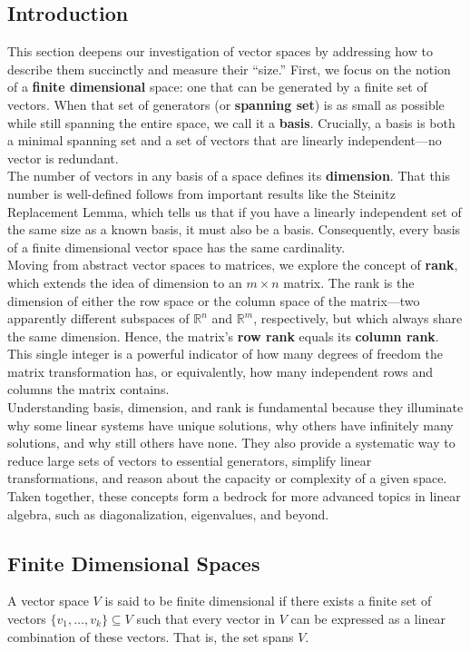 \documentclass[a4paper, 9pt]{extarticle}
\begin{document}
\subsection*{Introduction}
This section deepens our investigation of vector spaces by addressing how to describe them succinctly and measure their “size.” First, we focus on the notion of a \textbf{finite dimensional} space: one that can be generated by a finite set of vectors. When that set of generators (or \textbf{spanning set}) is as small as possible while still spanning the entire space, we call it a \textbf{basis}. Crucially, a basis is both a minimal spanning set and a set of vectors that are linearly independent—no vector is redundant. \\[2ex]
\noindent The number of vectors in any basis of a space defines its \textbf{dimension}. That this number is well-defined follows from important results like the Steinitz Replacement Lemma, which tells us that if you have a linearly independent set of the same size as a known basis, it must also be a basis. Consequently, every basis of a finite dimensional vector space has the same cardinality. \\[2ex]
\noindent Moving from abstract vector spaces to matrices, we explore the concept of \textbf{rank}, which extends the idea of dimension to an $m\times n$ matrix. The rank is the dimension of either the row space or the column space of the matrix—two apparently different subspaces of $\mathbb{R}^n$ and $\mathbb{R}^m$, respectively, but which always share the same dimension. Hence, the matrix’s \textbf{row rank} equals its \textbf{column rank}. This single integer is a powerful indicator of how many degrees of freedom the matrix transformation has, or equivalently, how many independent rows and columns the matrix contains. \\[2ex]
\noindent Understanding basis, dimension, and rank is fundamental because they illuminate why some linear systems have unique solutions, why others have infinitely many solutions, and why still others have none. They also provide a systematic way to reduce large sets of vectors to essential generators, simplify linear transformations, and reason about the capacity or complexity of a given space. Taken together, these concepts form a bedrock for more advanced topics in linear algebra, such as diagonalization, eigenvalues, and beyond.\\[2ex]
\subsection{Finite Dimensional Spaces}
\begin{definitionbox}{}{}
  A vector space $V$ is said to be finite dimensional if there exists a finite set of vectors $\{v_1, \dots, v_k\} \subseteq V$ such that every vector in $V$ can be expressed as a linear combination of these vectors. That is, the set spans $V$. \end{definitionbox}
\end{document}
